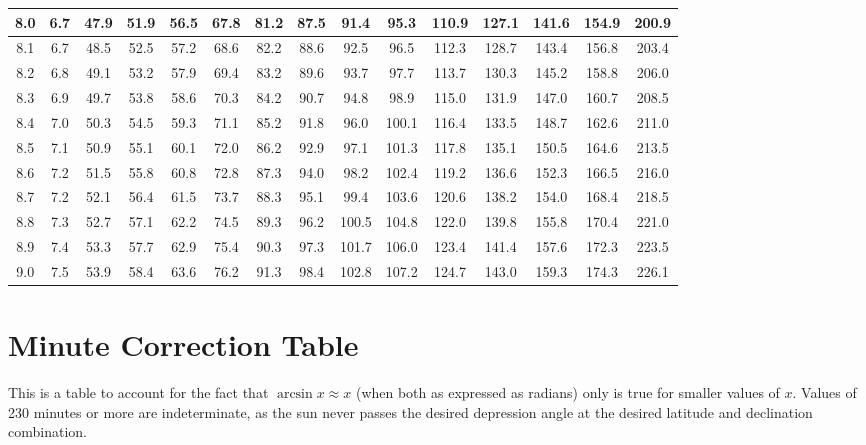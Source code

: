 \begin{footnotesize}
\begin{tabular}{c | c | c | c | c | c | c | c | c | c | c | c | c | c | c}
		8.0&6.7&47.9&51.9&56.5&67.8&81.2&87.5&91.4&95.3&110.9&127.1&141.6&154.9&200.9\\\hline
		8.1&6.7&48.5&52.5&57.2&68.6&82.2&88.6&92.5&96.5&112.3&128.7&143.4&156.8&203.4\\\hline
		8.2&6.8&49.1&53.2&57.9&69.4&83.2&89.6&93.7&97.7&113.7&130.3&145.2&158.8&206.0\\\hline
		8.3&6.9&49.7&53.8&58.6&70.3&84.2&90.7&94.8&98.9&115.0&131.9&147.0&160.7&208.5\\\hline
		8.4&7.0&50.3&54.5&59.3&71.1&85.2&91.8&96.0&100.1&116.4&133.5&148.7&162.6&211.0\\\hline
		8.5&7.1&50.9&55.1&60.1&72.0&86.2&92.9&97.1&101.3&117.8&135.1&150.5&164.6&213.5\\\hline
		8.6&7.2&51.5&55.8&60.8&72.8&87.3&94.0&98.2&102.4&119.2&136.6&152.3&166.5&216.0\\\hline
		8.7&7.2&52.1&56.4&61.5&73.7&88.3&95.1&99.4&103.6&120.6&138.2&154.0&168.4&218.5\\\hline
		8.8&7.3&52.7&57.1&62.2&74.5&89.3&96.2&100.5&104.8&122.0&139.8&155.8&170.4&221.0\\\hline
		8.9&7.4&53.3&57.7&62.9&75.4&90.3&97.3&101.7&106.0&123.4&141.4&157.6&172.3&223.5\\\hline
		9.0&7.5&53.9&58.4&63.6&76.2&91.3&98.4&102.8&107.2&124.7&143.0&159.3&174.3&226.1\\\hline
\end{tabular}\end{footnotesize}

\section{Minute Correction Table}

This is a table to account for the fact that $\arcsin x \approx x$ (when both as expressed as radians) only is true for smaller values of $x$. Values of 230 minutes or more are indeterminate, as the sun never passes the desired depression angle at the desired latitude and declination combination.

